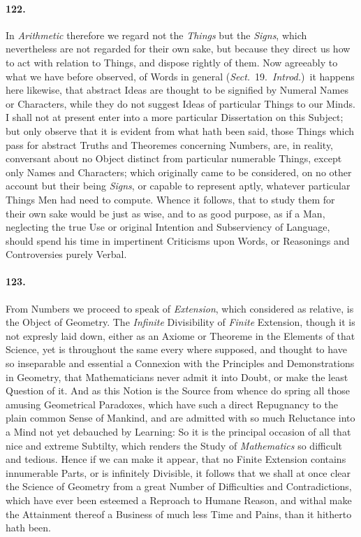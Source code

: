 \documentclass[]{article}
\newenvironment{sectionbody}{\begin{multicols}{2}}{\end{multicols}}
\begin{document}
\begin{sectionbody}
\paragraph{122.} In \emph{Arithmetic} therefore we regard not the
\emph{Things} but the \emph{Signs}, which nevertheless are
not regarded for their own sake, but because they direct us how
to act with relation to Things, and dispose rightly of them.  Now
agreeably to what we have before observed, of Words in general
(\emph{Sect.}\ 19.\ \emph{Introd.})\ it happens
here likewise, that abstract Ideas are thought to be
signified by Numeral Names or Characters, while they do not
suggest Ideas of particular Things to our Minds.  I shall not at
present enter into a more particular Dissertation on this
Subject; but only observe that it is evident from what hath been
said, those Things which pass for abstract Truths and Theoremes
concerning Numbers, are, in reality, conversant about no Object
distinct from particular numerable Things, except only Names and
Characters; which originally came to be considered, on no other
account but their being \emph{Signs}, or capable to represent
aptly, whatever particular Things Men had need to compute.
Whence it follows, that to study them for their own sake would be
just as wise, and to as good purpose, as if a Man, neglecting the
true Use or original Intention and Subserviency of Language,
should spend his time in impertinent Criticisms upon Words, or
Reasonings and Controversies purely Verbal.



\paragraph{123.} From Numbers we proceed to speak of \emph{Extension}, which
considered as relative, is the Object of Geometry.  The
\emph{Infinite} Divisibility of \emph{Finite} Extension,
though it is not expresly laid down, either as an Axiome or
Theoreme in the Elements of that Science, yet is throughout the
same every where supposed, and thought to have so inseparable and
essential a Connexion with the Principles and Demonstrations in
Geometry, that Mathematicians never admit it into Doubt, or make
the least Question of it.  And as this Notion is the Source from
whence do spring all those amusing Geometrical Paradoxes, which
have such a direct Repugnancy to the plain common Sense of
Mankind, and are admitted with so much Reluctance into a Mind not
yet debauched by Learning: So it is the principal occasion of all
that nice and extreme Subtilty, which renders the Study of
\emph{Mathematics} so difficult and tedious.  Hence if we can
make it appear, that no Finite Extension contains innumerable
Parts, or is infinitely Divisible, it follows that we shall at
once clear the Science of Geometry from a great Number of
Difficulties and Contradictions, which have ever been esteemed a
Reproach to Humane Reason, and withal make the Attainment thereof
a Business of much less Time and Pains, than it hitherto hath
been.




\end{sectionbody}
\end{document}
